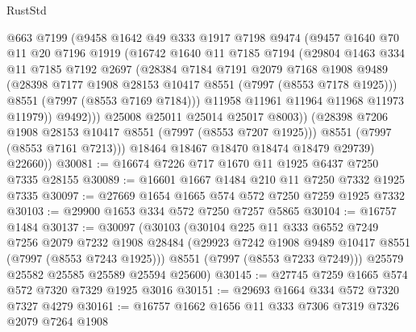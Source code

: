 \begin{lexlean}{RustStd}
\begin{coremodule}
{\begin{coremodule}
{{{{{{{{{{{{{{{{{{{{{{{{{{{{{{{{{{{{{{{{{{{                  @663
                  @7199
                  (@9458
                    @1642
                    @49
                    @333
                    @1917
                    @7198
                    @9474
                    (@9457
                      @1640
                      @70
                      @11
                      @20
                      @7196
                      @1919
                      (@16742
                        @1640
                        @11
                        @7185
                        @7194
                        (@29804
                          @1463
                          @334
                          @11
                          @7185
                          @7192
                          @2697
                          (@28384
                            @7184
                            @7191
                            @2079
                            @7168
                            @1908
                            @9489
                            (@28398 @7177 @1908 @28153 @10417 @8551 (@7997 (@8553 @7178 @1925)))
                            @8551
                            (@7997 (@8553 @7169 @7184)))
                          @11958
                          @11961
                          @11964
                          @11968
                          @11973
                          @11979))
                      @9492)))
                @25008
                @25011
                @25014
                @25017
                @8003))
            (@28398 @7206 @1908 @28153 @10417 @8551 (@7997 (@8553 @7207 @1925)))
            @8551
            (@7997 (@8553 @7161 @7213)))
          @18464
          @18467
          @18470
          @18474
          @18479
          @29739)
        @22660))
@30081 := @16674 @7226 @717 @1670 @11 @1925 @6437 @7250 @7335 @28155
@30089 := @16601 @1667 @1484 @210 @11 @7250 @7332 @1925 @7335
@30097 := @27669 @1654 @1665 @574 @572 @7250 @7259 @1925 @7332
@30103 := @29900 @1653 @334 @572 @7250 @7257 @5865
@30104 := @16757 @1484
@30137 := @30097
    (@30103
      (@30104
        @225
        @11
        @333
        @6552
        @7249
        @7256
        @2079
        @7232
        @1908
        @28484
        (@29923 @7242 @1908 @9489 @10417 @8551 (@7997 (@8553 @7243 @1925)))
        @8551
        (@7997 (@8553 @7233 @7249)))
      @25579
      @25582
      @25585
      @25589
      @25594
      @25600)
@30145 := @27745 @7259 @1665 @574 @572 @7320 @7329 @1925 @3016
@30151 := @29693 @1664 @334 @572 @7320 @7327 @4279
@30161 := @16757 @1662 @1656 @11 @333 @7306 @7319 @7326 @2079 @7264 @1908
}}}}}}}}}}}}}}}}}}}}}}}}}}}}}}}}}}}}}}}}}}}
\end{coremodule}}
\end{coremodule}
\end{lexlean}
